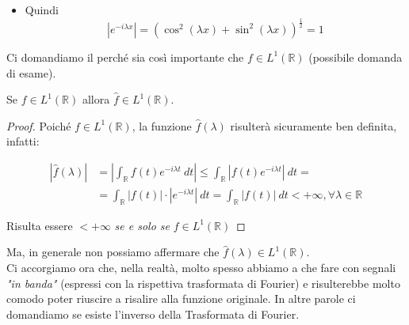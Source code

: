 \begin{itemize}
\begin{center}
\begin{tikzpicture}[x=1.0pt,y=1.0pt,yscale=-1,xscale=1]
                  
              \end{tikzpicture}
          \end{center}
    \item Quindi
          $$
              |e^{-i \lambda x}| = (\cos^2 (\lambda x) + \sin^2(\lambda
              x))^{\frac{1}{2}} = 1
          $$
          
\end{itemize}

\vspace{1cm}

Ci domandiamo il perché sia così importante che $f \in L^1(\mathbb{R})$
(possibile domanda di esame).\\

\begin{center}
    Se $f \in L^1(\mathbb{R})$ allora $\hat{f} \in L^1(\mathbb{R})$.
\end{center}

\begin{proof}
    Poiché $f \in L^1(\mathbb{R})$, la funzione $\hat{f}(\lambda)$ risulterà
    sicuramente ben definita, infatti:
    
    \begin{equation}
        \begin{aligned}
            |\hat{f}(\lambda)| & = \left|\int_{\mathbb{R}} f(t) e^{-i \lambda t} \ dt \right| \leq \int_{\mathbb{R}} |f(t) e^{-i \lambda t}| \ dt =                  \\
                               & = \int_{\mathbb{R}} |f(t)| \cdot |e^{-i \lambda t}| \ dt = \int_{\mathbb{R}} |f(t)| \ dt < + \infty, \forall \lambda \in \mathbb{R}
        \end{aligned}
    \end{equation}
    
    Risulta essere $< +\infty$ \textit{se e solo se} $f\in L^1(\mathbb{R})$
    
\end{proof}

Ma, in generale non possiamo affermare che $\hat{f}(\lambda)
    \in L^1(\mathbb{R})$.\\


Ci accorgiamo ora che, nella realtà, molto spesso abbiamo a che fare con segnali
\textit{"in banda"} (espressi con la rispettiva trasformata di Fourier) e
risulterebbe molto comodo poter riuscire a risalire alla funzione originale. In
altre parole ci domandiamo se esiste l'inverso della Trasformata di Fourier.

